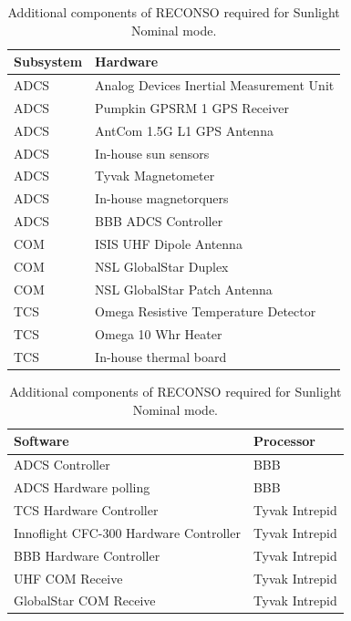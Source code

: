 \documentclass{article}
\begin{document}
\begin{table}[h!]
\caption{Additional components of RECONSO required for Sunlight Nominal mode.}
\begin{adjustbox}{center}
\begin{tabular}{|l|l|}
\hline
Subsystem & Hardware \\ \hline \hline
ADCS & Analog Devices Inertial Measurement Unit  \\ \hline
ADCS & Pumpkin GPSRM 1 GPS Receiver \\ \hline
ADCS & AntCom 1.5G L1 GPS Antenna  \\ \hline
ADCS & In-house sun sensors  \\ \hline
ADCS & Tyvak Magnetometer \\ \hline
ADCS & In-house magnetorquers \\ \hline
ADCS & BBB ADCS Controller \\ \hline \hline
COM & ISIS UHF Dipole Antenna  \\ \hline
COM & NSL GlobalStar Duplex  \\ \hline
COM & NSL GlobalStar Patch Antenna \\ \hline \hline
TCS & Omega Resistive Temperature Detector \\ \hline
TCS & Omega 10 Whr Heater  \\ \hline
TCS & In-house thermal board \\ \hline
\end{tabular}

\quad

\begin{tabular}{|l|l|}
\hline
Software & Processor \\ \hline \hline
ADCS Controller & BBB \\ \hline
ADCS Hardware polling & BBB \\ \hline \hline
TCS Hardware Controller & Tyvak Intrepid \\ \hline
Innoflight CFC-300 Hardware Controller & Tyvak Intrepid \\ \hline
BBB Hardware Controller & Tyvak Intrepid \\ \hline
UHF COM Receive & Tyvak Intrepid \\ \hline
GlobalStar COM Receive & Tyvak Intrepid \\ \hline
\end{tabular}
\end{adjustbox}
\end{table}
\end{document}
